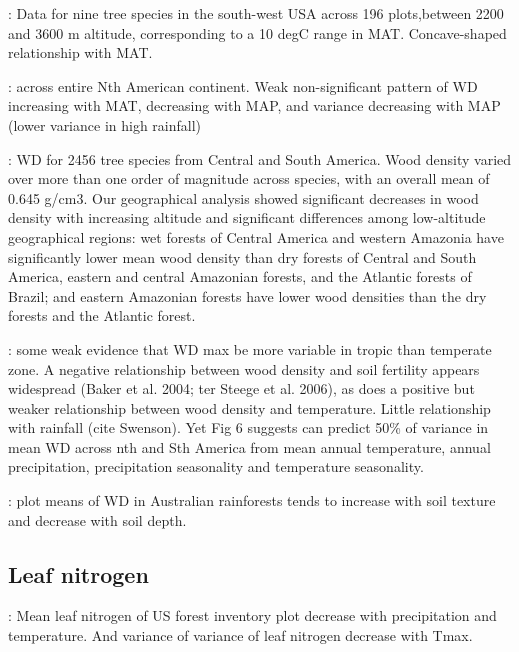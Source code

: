 \documentclass[a4paper,11pt]{article}
\begin{document}
\citet{Laughlin-2012}: Data for nine tree species in the south-west USA across 196 plots,between 2200 and 3600 m altitude, corresponding to a 10 degC range in MAT. Concave-shaped relationship with MAT.

\citet{Simova-2014}: across entire Nth American continent. Weak non-significant pattern of WD increasing with MAT, decreasing with MAP, and variance decreasing with MAP (lower variance in high rainfall)

\citet{Chave-2006}: WD for 2456 tree species from Central and South America. Wood density varied over more than one order of magnitude across species, with an overall mean of 0.645 g/cm3. Our geographical analysis showed significant decreases in wood density with increasing altitude and significant differences among low-altitude geographical regions: wet forests of Central America and western Amazonia have significantly lower mean wood density than dry forests of Central and South America, eastern and central Amazonian forests, and the Atlantic forests of Brazil; and eastern Amazonian forests have lower wood densities than the dry forests and the Atlantic forest.

\citet{Chave-2009}: some weak evidence that WD max be more variable in tropic than temperate zone. A negative relationship between wood density and soil fertility appears widespread (Baker et al. 2004; ter Steege et al. 2006), as does a positive but weaker relationship between wood density and temperature. Little relationship with rainfall (cite Swenson). Yet Fig 6 suggests can predict 50\% of variance in mean WD across nth and Sth America from mean annual temperature, annual precipitation, precipitation seasonality and temperature seasonality.

\citet{Kooyman-2010}: plot means of WD in Australian rainforests tends to increase with soil texture and decrease with soil depth.


\subsection{Leaf nitrogen}

\citet{Swenson-2010}: Mean leaf nitrogen of US forest inventory plot decrease with precipitation and temperature. And variance of variance of leaf nitrogen decrease with Tmax.


\clearpage



\end{document}
